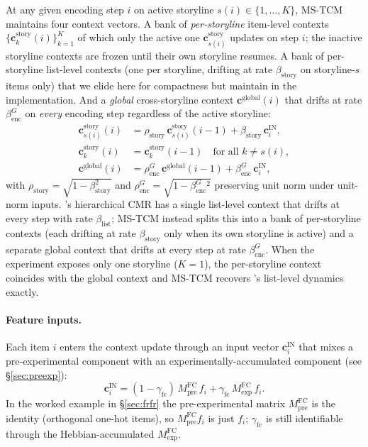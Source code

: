 \documentclass[10pt]{article}
\newcommand{\cstory}{\mathbf{c}^{\mathrm{story}}}
\newcommand{\cglob}{\mathbf{c}^{\mathrm{global}}}
\newcommand{\cin}{\mathbf{c}^{\mathrm{IN}}}
\newcommand{\MFCpre}{M^{\mathrm{FC}}_{\mathrm{pre}}}
\newcommand{\MFCexp}{M^{\mathrm{FC}}_{\mathrm{exp}}}
\newcommand{\betaencG}{\beta_{\mathrm{enc}}^{G}}
\newcommand{\betastory}{\beta_{\mathrm{story}}}
\newcommand{\betalist}{\beta_{\mathrm{list}}}
\newcommand{\gammafc}{\gamma_{\mathrm{fc}}}
\newcommand{\rhoencG}{\rho_{\mathrm{enc}}^{G}}
\newcommand{\rhostory}{\rho_{\mathrm{story}}}
\begin{document}
At any given encoding step $i$ on active storyline $s(i) \in
\{1,\dots,K\}$, MS-TCM maintains four context vectors. A bank of
\emph{per-storyline} item-level contexts $\{\cstory_{k}(i)\}_{k=1}^{K}$
of which only the active one $\cstory_{s(i)}$ updates on step $i$;
the inactive storyline contexts are frozen until their own storyline
resumes. A bank of per-storyline list-level contexts (one per
storyline, drifting at rate $\betastory$ on storyline-$s$ items only)
that we elide here for compactness but maintain in the implementation.
And a \emph{global} cross-storyline context $\cglob(i)$ that drifts
at rate $\betaencG$ on \emph{every} encoding step regardless of the
active storyline:
\begin{align}
  \cstory_{s(i)}(i)    &= \rhostory\,\cstory_{s(i)}(i-1)  + \betastory\,\cin_i,\label{eq:cstory}\\[2pt]
  \cstory_{k}(i)       &= \cstory_{k}(i-1) \quad \text{for all } k \neq s(i),\label{eq:cstory-frozen}\\[2pt]
  \cglob(i)            &= \rhoencG\,\cglob(i-1) + \betaencG\,\cin_i,\label{eq:cglob}
\end{align}
with $\rhostory = \sqrt{1-\betastory^2}$ and $\rhoencG =
\sqrt{1-\betaencG^2}$ preserving unit norm under unit-norm inputs.
\citet{CornellZhang2025}'s hierarchical CMR has a single list-level
context that drifts at every step with rate $\betalist$; MS-TCM
instead splits this into a bank of per-storyline contexts (each
drifting at rate $\betastory$ only when its own storyline is active)
and a separate global context that drifts at every step at rate
$\betaencG$. When the experiment exposes only one storyline ($K=1$),
the per-storyline context coincides with the global context and
MS-TCM recovers \citeauthor{CornellZhang2025}'s list-level dynamics
exactly.

\paragraph{Feature inputs.}
Each item $i$ enters the context update through an input vector
$\cin_i$ that mixes a pre-experimental component with an
experimentally-accumulated component (see \S\ref{sec:preexp}):
\begin{equation}
  \cin_i = (1 - \gammafc)\,\MFCpre\,f_i + \gammafc\,\MFCexp\,f_i.
  \label{eq:cin}
\end{equation}
In the worked example in \S\ref{sec:frfr} the pre-experimental matrix
$\MFCpre$ is the identity (orthogonal one-hot items), so
$\MFCpre f_i$ is just $f_i$; $\gammafc$ is still identifiable through
the Hebbian-accumulated $\MFCexp$.
\end{document}
